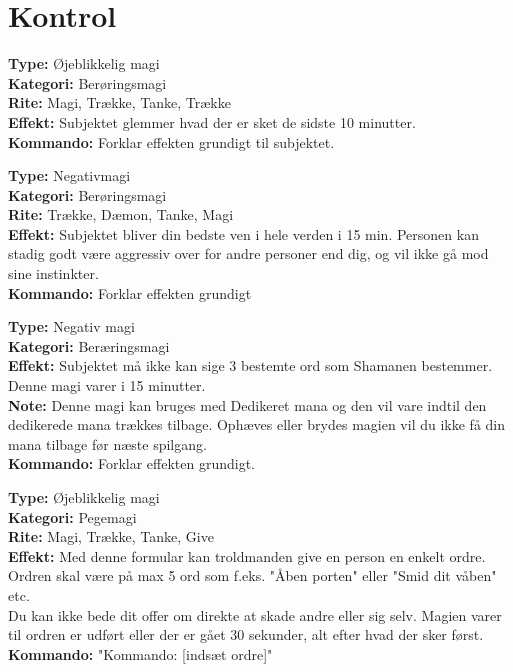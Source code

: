 \section{Kontrol}

\begin{kontrol*}[Glemsel]
\textbf{Type:} Øjeblikkelig magi\\
\textbf{Kategori:} Berøringsmagi\\
\textbf{Rite:} Magi, Trække, Tanke, Trække\\
\textbf{Effekt:} Subjektet glemmer hvad der er sket de sidste 10 minutter.\\
\textbf{Kommando:} Forklar effekten grundigt til subjektet.
\end{kontrol*}

\begin{kontrol*}[Venskab]
\textbf{Type:} Negativmagi\\
\textbf{Kategori:} Berøringsmagi\\
\textbf{Rite:} Trække, Dæmon, Tanke, Magi\\
\textbf{Effekt:} Subjektet bliver din bedste ven i hele verden i 15 min. Personen kan stadig godt være aggressiv over for andre personer end dig, og vil ikke gå mod sine instinkter.\\
\textbf{Kommando:} Forklar effekten grundigt
\end{kontrol*}

\begin{kontrol*}
\textbf{Type:} Negativ magi\\
\textbf{Kategori:} Beræringsmagi\\
\textbf{Effekt:} Subjektet må ikke kan sige 3 bestemte ord som Shamanen bestemmer. Denne magi varer i 15 minutter.\\
\textbf{Note:} Denne magi kan bruges med Dedikeret mana og den vil vare indtil den dedikerede mana trækkes tilbage. Ophæves eller brydes magien vil du ikke få din mana tilbage før næste spilgang.\\
\textbf{Kommando:} Forklar effekten grundigt.
\end{kontrol*}

\begin{kontrol*}[Kommando]
\textbf{Type:} Øjeblikkelig magi\\
\textbf{Kategori:} Pegemagi\\
\textbf{Rite:} Magi, Trække, Tanke, Give\\
\textbf{Effekt:} Med denne formular kan troldmanden give en person en enkelt ordre. Ordren skal være på max 5 ord som f.eks. "Åben porten" eller "Smid dit våben" etc. \\
Du kan ikke bede dit offer om direkte at skade andre eller sig selv. Magien varer til ordren er udført eller der er gået 30 sekunder, alt efter hvad der
sker først.\\
\textbf{Kommando:} "Kommando: [indsæt ordre]"
\end{kontrol*}